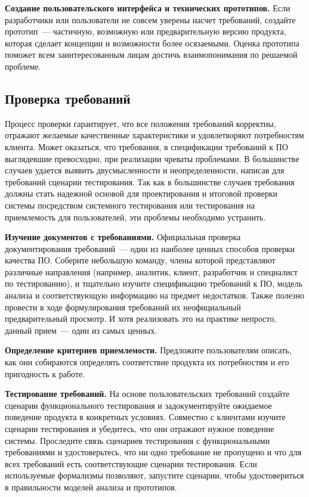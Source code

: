 \documentclass{../../text-style}
\begin{document}
\textbf{Создание пользовательского интерфейса и технических прототипов.}
Если разработчики или пользователи не совсем уверены насчет требований, создайте прототип~--- частичную, возможную или предварительную версию продукта, которая сделает концепции и возможности более осязаемыми.
Оценка прототипа поможет всем заинтересованным лицам достичь взаимопонимания по решаемой проблеме.

\subsection{Проверка требований}

Процесс проверки гарантирует, что все положения требований корректны, отражают желаемые качественные характеристики и удовлетворяют потребностям клиента.
Может оказаться, что требования, в спецификации требований к ПО выглядевшие превосходно, при реализации чреваты проблемами.
В большинстве случаев удается выявить двусмысленности и неопределенности, написав для требований сценарии тестирования.
Так как в большинстве случаев требования должны стать надежной основой для проектирования и итоговой проверки системы посредством системного тестирования или тестирования на приемлемость для пользователей, эти проблемы необходимо устранить.

\textbf{Изучение документов с требованиями.}
Официальная проверка документирования требований~--- один из наиболее ценных способов проверки качества ПО.
Соберите небольшую команду, члены которой представляют различные направления (например, аналитик, клиент, разработчик и специалист по тестированию), и тщательно изучите спецификацию требований к ПО, модель анализа и соответствующую информацию на предмет недостатков.
Также полезно провести в ходе формулирования требований их неофициальный предварительный просмотр.
И хотя реализовать это на практике непросто, данный прием~--- один из самых ценных.

\textbf{Определение критериев приемлемости.}
Предложите пользователям описать, как они собираются определять соответствие продукта их потребностям и его пригодность к работе.

\textbf{Тестирование требований.}
На основе пользовательских требований создайте сценарии функционального тестирования и задокументируйте ожидаемое поведение продукта в конкретных условиях.
Совместно с клиентами изучите сценарии тестирования и убедитесь, что они отражают нужное поведение системы.
Проследите связь сценариев тестирования с функциональными требованиями и удостоверьтесь, что ни одно требование не пропущено и что для всех требований есть соответствующие сценарии тестирования.
Если используемые формализмы позволяют, запустите сценарии, чтобы удостовериться в правильности моделей анализа и прототипов.
\end{document}
